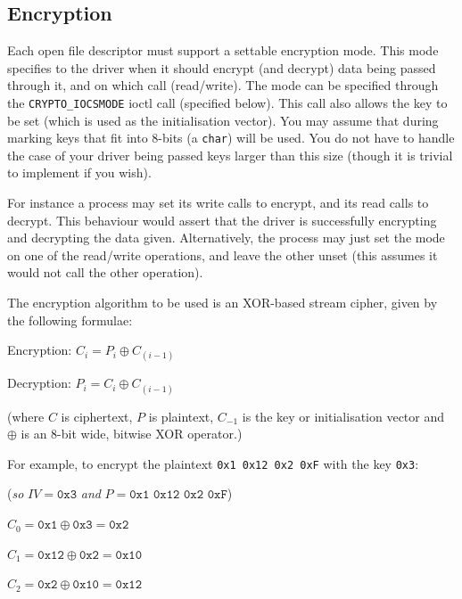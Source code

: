 \documentclass[12pt,a4paper]{article}
\begin{document}
\subsection*{Encryption}

Each open file descriptor must support a settable encryption mode. This mode
specifies to the driver when it should encrypt (and decrypt) data being passed
through it, and on which call (read\slash write). The mode can be specified
through the \texttt{CRYPTO\_IOCSMODE} ioctl call (specified below). This call
also allows the key to be set (which is used as the initialisation vector). You
may assume that during marking keys that fit into 8-bits (a \texttt{char}) will
be used. You do not have to handle the case of your driver being passed keys
larger than this size (though it is trivial to implement if you wish).

For instance a process may set its write calls to encrypt, and its read calls to
decrypt. This behaviour would assert that the driver is successfully encrypting
and decrypting the data given. Alternatively, the process may just set the mode
on one of the read\slash write operations, and leave the other unset (this assumes
it would not call the other operation).

The encryption algorithm to be used is an XOR-based stream cipher, given by the
following formulae:

Encryption: $C_i = P_i \oplus C_{(i-1)}$

Decryption: $P_i = C_i \oplus C_{(i-1)}$

\vspace{0.5cm}

(where $C$ is ciphertext, $P$ is plaintext, $C_{-1}$ is the key or initialisation vector and $\oplus$ is an 8-bit wide, bitwise XOR operator.)

\vspace{0.5cm}

For example, to encrypt the plaintext \texttt{0x1 0x12 0x2 0xF} with the key \texttt{0x3}:

(\textit{so} $IV = \texttt{0x3}$ \textit{and} $P = \texttt{0x1 0x12 0x2 0xF}$)

\vspace{0.5cm}

$C_0 = \texttt{0x1} \oplus \texttt{0x3} = \texttt{0x2}$

$C_1 = \texttt{0x12} \oplus \texttt{0x2} = \texttt{0x10}$

$C_2 = \texttt{0x2} \oplus \texttt{0x10} = \texttt{0x12}$
\end{document}
